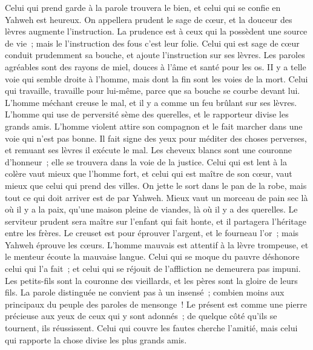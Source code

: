 \begin{multicols}{2}
Celui qui prend garde à la parole trouvera le bien, et celui qui se confie en Yahweh est heureux.
On appellera prudent le sage de cœur, et la douceur des lèvres augmente l'instruction.
La prudence est à ceux qui la possèdent une source de vie~; mais le l'instruction des fous c'est leur folie.
Celui qui est sage de cœur conduit prudemment sa bouche, et ajoute l'instruction sur ses lèvres.
Les paroles agréables sont des rayons de miel, douces à l'âme et santé pour les os.
 II y a telle voie qui semble droite à l'homme, mais dont la fin sont les voies de la mort.
Celui qui travaille, travaille pour lui-même, parce que sa bouche se courbe devant lui.
L'homme méchant creuse le mal, et il y a comme un feu brûlant sur ses lèvres.
L'homme qui use de perversité sème des querelles, et le rapporteur divise les grands amis.
L'homme violent attire son compagnon et le fait marcher dans une voie qui n'est pas bonne.
Il fait signe des yeux pour méditer des choses perverses, et remuant ses lèvres il exécute le mal.
Les cheveux blancs sont une couronne d'honneur~; elle se trouvera dans la voie de la justice.
Celui qui est lent à la colère vaut mieux que l'homme fort, et celui qui est maître de son cœur, vaut mieux que celui qui prend des villes.
On jette le sort dans le pan de la robe, mais tout ce qui doit arriver est de par Yahweh.
\VerseOne{}Mieux vaut un morceau de pain sec là où il y a la paix, qu'une maison pleine de viandes, là où il y a des querelles.
Le serviteur prudent sera maître sur l'enfant qui fait honte, et il partagera l'héritage entre les frères.
Le creuset est pour éprouver l'argent, et le fourneau l'or~; mais Yahweh éprouve les cœurs.
L'homme mauvais est attentif à la lèvre trompeuse, et le menteur écoute la mauvaise langue.
Celui qui se moque du pauvre déshonore celui qui l'a fait~; et celui qui se réjouit de l'affliction ne demeurera pas impuni.
Les petits-fils sont la couronne des vieillards, et les pères sont la gloire de leurs fils.
La parole distinguée ne convient pas à un insensé~; combien moins aux principaux du peuple des paroles de mensonge~!
Le présent est comme une pierre précieuse aux yeux de ceux qui y sont adonnés~; de quelque côté qu'ils se tournent, ils réussissent.
Celui qui couvre les fautes cherche l'amitié, mais celui qui rapporte la chose divise les plus grands amis.

\end{multicols}
